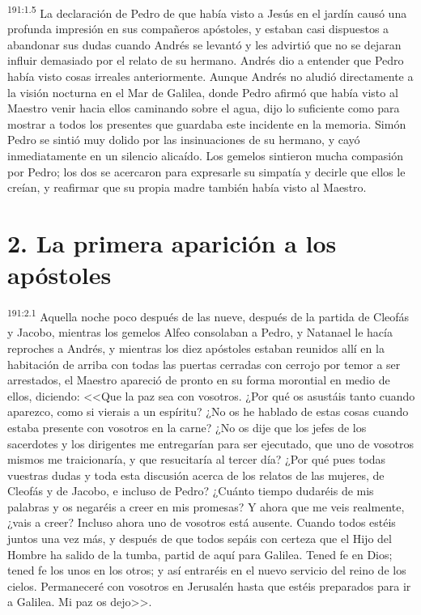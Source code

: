 \par 
\textsuperscript{191:1.5} La declaración de Pedro de que había visto a Jesús en el jardín causó una profunda impresión en sus compañeros apóstoles, y estaban casi dispuestos a abandonar sus dudas cuando Andrés se levantó y les advirtió que no se dejaran influir demasiado por el relato de su hermano. Andrés dio a entender que Pedro había visto cosas irreales anteriormente. Aunque Andrés no aludió directamente a la visión nocturna en el Mar de Galilea, donde Pedro afirmó que había visto al Maestro venir hacia ellos caminando sobre el agua, dijo lo suficiente como para mostrar a todos los presentes que guardaba este incidente en la memoria. Simón Pedro se sintió muy dolido por las insinuaciones de su hermano, y cayó inmediatamente en un silencio alicaído. Los gemelos sintieron mucha compasión por Pedro; los dos se acercaron para expresarle su simpatía y decirle que ellos le creían, y reafirmar que su propia madre también había visto al Maestro.

\section*{2. La primera aparición a los apóstoles}
\par 
\textsuperscript{191:2.1} Aquella noche poco después de las nueve, después de la partida de Cleofás y Jacobo, mientras los gemelos Alfeo consolaban a Pedro, y Natanael le hacía reproches a Andrés, y mientras los diez apóstoles estaban reunidos allí en la habitación de arriba con todas las puertas cerradas con cerrojo por temor a ser arrestados, el Maestro apareció de pronto en su forma morontial en medio de ellos, diciendo: <<Que la paz sea con vosotros. ¿Por qué os asustáis tanto cuando aparezco, como si vierais a un espíritu? ¿No os he hablado de estas cosas cuando estaba presente con vosotros en la carne? ¿No os dije que los jefes de los sacerdotes y los dirigentes me entregarían para ser ejecutado, que uno de vosotros mismos me traicionaría, y que resucitaría al tercer día? ¿Por qué pues todas vuestras dudas y toda esta discusión acerca de los relatos de las mujeres, de Cleofás y de Jacobo, e incluso de Pedro? ¿Cuánto tiempo dudaréis de mis palabras y os negaréis a creer en mis promesas? Y ahora que me veis realmente, ¿vais a creer? Incluso ahora uno de vosotros está ausente. Cuando todos estéis juntos una vez más, y después de que todos sepáis con certeza que el Hijo del Hombre ha salido de la tumba, partid de aquí para Galilea. Tened fe en Dios; tened fe los unos en los otros; y así entraréis en el nuevo servicio del reino de los cielos. Permaneceré con vosotros en Jerusalén hasta que estéis preparados para ir a Galilea. Mi paz os dejo>>.

